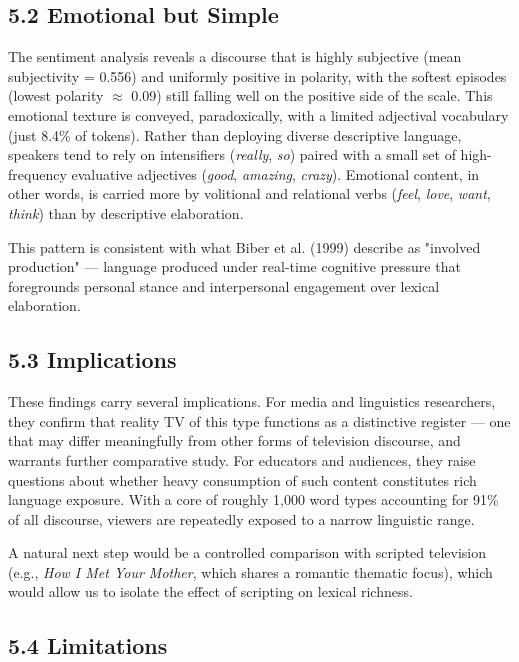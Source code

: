 \documentclass[11pt]{article}
\begin{document}
\subsection*{5.2 Emotional but Simple}

The sentiment analysis reveals a discourse that is highly subjective (mean subjectivity = 0.556) and uniformly positive in polarity, with the softest episodes (lowest polarity $\approx$ 0.09) still falling well on the positive side of the scale. This emotional texture is conveyed, paradoxically, with a limited adjectival vocabulary (just 8.4\% of tokens). Rather than deploying diverse descriptive language, speakers tend to rely on intensifiers (\emph{really}, \emph{so}) paired with a small set of high-frequency evaluative adjectives (\emph{good}, \emph{amazing}, \emph{crazy}). Emotional content, in other words, is carried more by volitional and relational verbs (\emph{feel}, \emph{love}, \emph{want}, \emph{think}) than by descriptive elaboration.

This pattern is consistent with what Biber et al. (1999) describe as "involved production" --- language produced under real-time cognitive pressure that foregrounds personal stance and interpersonal engagement over lexical elaboration.

\subsection*{5.3 Implications}

These findings carry several implications. For media and linguistics researchers, they confirm that reality TV of this type functions as a distinctive register --- one that may differ meaningfully from other forms of television discourse, and warrants further comparative study. For educators and audiences, they raise questions about whether heavy consumption of such content constitutes rich language exposure. With a core of roughly 1,000 word types accounting for 91\% of all discourse, viewers are repeatedly exposed to a narrow linguistic range.

A natural next step would be a controlled comparison with scripted television (e.g., \emph{How I Met Your Mother}, which shares a romantic thematic focus), which would allow us to isolate the effect of scripting on lexical richness.

\subsection*{5.4 Limitations}
\end{document}
